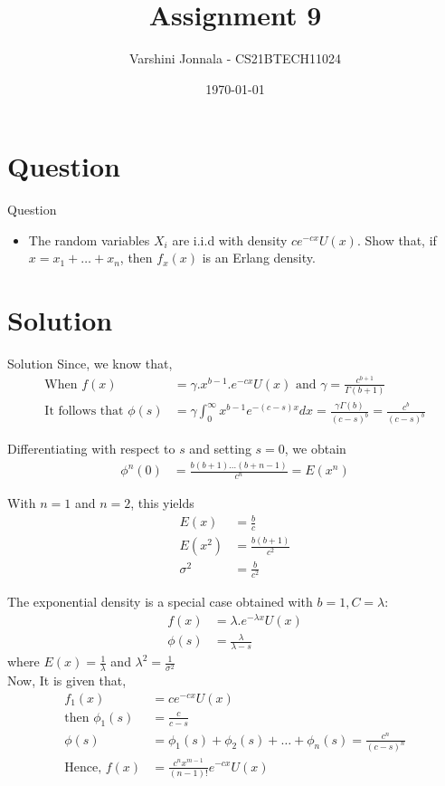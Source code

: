 \documentclass{beamer}
\title{Assignment 9}
\author{Varshini Jonnala - CS21BTECH11024}
\date{\today}
\providecommand{\brak}[1]{\ensuremath{\left(#1\right)}}
\begin{document}
\begin{frame}
    \titlepage 
\end{frame}

\section{Question}
\begin{frame}{Question}
\begin{itemize}
    \item The random variables $X_i$ are i.i.d with density $ce^{-cx} U(x)$. Show that, if $x = x_1+\dots+x_n$, then $f_x(x)$ is an Erlang density.  
\end{itemize}
\end{frame}

\section{Solution}
\begin{frame}[allowframebreaks]{Solution}
 Since, we know that,
\begin{align}
 \text{When } f(x) &= \gamma .x^{b-1} .e^{-cx} U(x) \text{ and } \gamma = \frac{c^{b+1}}{\Gamma (b+1)} \\
\text{It follows that } \phi (s) &= \gamma \int_{0}^{\infty} x^{b-1} e^{-(c-s)x} dx = \frac{\gamma \Gamma (b)}{\brak{c-s}^b} = \frac{c^b}{\brak{c-s}^b} 
\end{align}

Differentiating with respect to $s$ and setting $s = 0$, we obtain
\begin{align}
    \phi^{n} (0) &= \frac{b(b+1)\dots(b+n-1)}{c^n} = E\brak{x^n}
\end{align}
    
With $n = 1$ and $n = 2$, this yields 
    \begin{align}
        E\brak{x} &= \frac{b}{c} \\
        E \brak{x^2} &= \frac{b(b+1)}{c^2}\\
        \sigma^2 &= \frac{b}{c^2}
    \end{align}
    
    The exponential density is a special case obtained with $b = 1, C = \lambda$: 
    \begin{align}
        f(x) &= \lambda . e^{-\lambda x} U(x) \\
        \phi (s) &= \frac{\lambda}{\lambda - s} 
    \end{align}
    where $E\brak{x} = \frac{1}{\lambda}$ and  $\lambda^2 = \frac{1}{\sigma^2}$ \\ 
Now, It is given that, 
\begin{align}
f_1(x) &= ce^{-cx} U(x) \\
\text{then } \phi_1(s) &= \frac{c}{c-s}\\
\phi(s) &= \phi_1(s) + \phi_2(s) + \dots + \phi_n(s) = \frac{c^n}{\brak{c-s}^n}\\
   \text{Hence, } f(x) &= \frac{c^n x^{m-1}}{\brak{n-1}!} e^{-cx} U(x)  
    \end{align}
\end{frame} 
\end{document}
